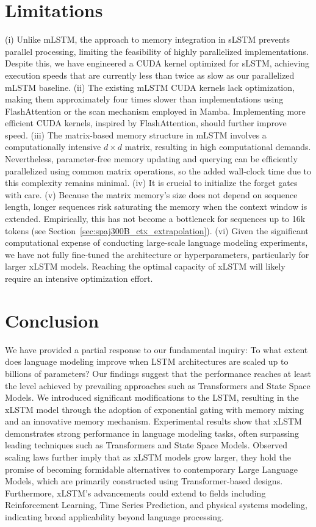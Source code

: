 \section{Limitations}

(i) Unlike mLSTM, the approach to memory integration in sLSTM prevents parallel processing, limiting the feasibility of highly parallelized implementations. Despite this, we have engineered a CUDA kernel optimized for sLSTM, achieving execution speeds that are currently less than twice as slow as our parallelized mLSTM baseline. (ii) The existing mLSTM CUDA kernels lack optimization, making them approximately four times slower than implementations using FlashAttention or the scan mechanism employed in Mamba. Implementing more efficient CUDA kernels, inspired by FlashAttention, should further improve speed. (iii) The matrix-based memory structure in mLSTM involves a computationally intensive $d \times d$ matrix, resulting in high computational demands. Nevertheless, parameter-free memory updating and querying can be efficiently parallelized using common matrix operations, so the added wall-clock time due to this complexity remains minimal. (iv) It is crucial to initialize the forget gates with care. (v) Because the matrix memory’s size does not depend on sequence length, longer sequences risk saturating the memory when the context window is extended. Empirically, this has not become a bottleneck for sequences up to 16k tokens (see Section~\ref{sec:spaj300B_ctx_extrapolation}). (vi) Given the significant computational expense of conducting large-scale language modeling experiments, we have not fully fine-tuned the architecture or hyperparameters, particularly for larger xLSTM models. Reaching the optimal capacity of xLSTM will likely require an intensive optimization effort.

\section{Conclusion}
We have provided a partial response to our fundamental inquiry: To what extent does language modeling improve when LSTM architectures are scaled up to billions of parameters? Our findings suggest that the performance reaches at least the level achieved by prevailing approaches such as Transformers and State Space Models. We introduced significant modifications to the LSTM, resulting in the xLSTM model through the adoption of exponential gating with memory mixing and an innovative memory mechanism. Experimental results show that xLSTM demonstrates strong performance in language modeling tasks, often surpassing leading techniques such as Transformers and State Space Models. Observed scaling laws further imply that as xLSTM models grow larger, they hold the promise of becoming formidable alternatives to contemporary Large Language Models, which are primarily constructed using Transformer-based designs. Furthermore, xLSTM's advancements could extend to fields including Reinforcement Learning, Time Series Prediction, and physical systems modeling, indicating broad applicability beyond language processing.

